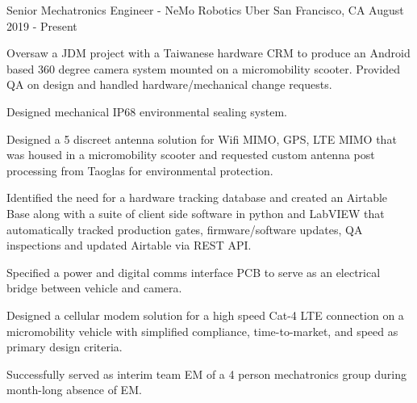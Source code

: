 

\begin{cventries}

  \cventry
    {Senior Mechatronics Engineer - NeMo Robotics} %
    {Uber} %
    {San Francisco, CA} %
    {August 2019 - Present} %
    {
      \begin{cvitems} %
        \item {Oversaw a JDM project with a Taiwanese hardware CRM to produce an Android 
                based 360 degree camera system mounted on a micromobility scooter. Provided QA 
            on design and handled hardware/mechanical change requests.}
        \item {Designed mechanical IP68 environmental sealing system.}
        \item {Designed a 5 discreet antenna solution for Wifi MIMO, GPS, LTE MIMO that was housed in a micromobility scooter and requested custom antenna post processing from Taoglas for environmental protection.}
        \item {Identified the need for a hardware tracking database and created an Airtable Base along with a suite of client side software in python and LabVIEW that automatically tracked production gates, firmware/software
                updates, QA inspections and updated Airtable via REST API.}
        \item {Specified a power and digital comms interface PCB to serve as an electrical bridge between vehicle and camera.} 
        \item {Designed a cellular modem solution for a high speed Cat-4 LTE connection on a micromobility vehicle with simplified compliance, time-to-market, and speed as primary design criteria.}
        \item {Successfully served as interim team EM of a 4 person mechatronics group during month-long absence of EM.}
      \end{cvitems}
    }


\end{cventries}
